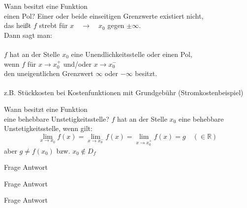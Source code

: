\documentclass[a6paper,12pt,print,grid=none,parskip=half]{kartei}
\begin{document}
\begin{karte}{Wann besitzt eine Funktion \\einen Pol?}
Einer oder beide einseitigen Grenzwerte existiert nicht, \\das heißt $f$ strebt für $x\quad \rightarrow \quad { x }_{ 0 }$ gegen $\pm \infty$. \\Dann sagt man: \\
\\
$f$ hat an der Stelle $x_0$ eine Unendlichkeitsstelle oder einen Pol, \\
wenn $f$ für $x\rightarrow { x }_{ 0 }^{ + }$ und/oder $x\rightarrow { x }_{ 0 }^{ - }$ \\
den uneigentlichen Grenzwert $\infty$ oder $-\infty$ besitzt.\\
\\
z.B. Stückkosten bei Kostenfunktionen mit Grundgebühr (Stromkostenbeispiel)
\end{karte}

\begin{karte}{Wann besitzt eine Funktion\\ eine behebbare Unstetigkeitsstelle?}
$f$ hat an der Stelle $x_0$ eine behebbare Unstetigkeitsstelle, wenn gilt: \\
\[\lim _{ x\rightarrow { x }_{ 0 } }{ f(x) } =\lim _{ x\rightarrow { x }_{ 0 }^{ - } }{ f(x) } =\lim _{ x\rightarrow { x }_{ 0 }^{ + } }{ f(x) } =g \quad (\in \mathbb{R})\]
aber $g\neq  f\left( x_0 \right)$ bzw. $x_0\notin D_f$

\end{karte}

\begin{karte}{Frage}
Antwort
\end{karte}

\begin{karte}{Frage}
Antwort
\end{karte}



\begin{karte}{Frage}
Antwort
\end{karte}
\end{document}
